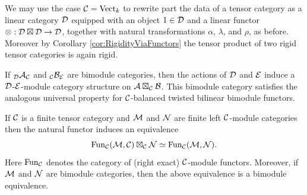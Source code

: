 \documentclass{amsart}
\begin{document}


\begin{remark} \label{rmk:rigidpreservedbytensor}
	We may use the case $\mathcal C= \mathrm{Vect}_k$ to rewrite part the data  of a tensor category as a linear category $\mathcal D$ equipped with an object $1 \in \mathcal D$ and a linear functor $\otimes: \mathcal D \boxtimes \mathcal D \to \mathcal D $, together with natural transformations $\alpha$, $\lambda$, and $\rho$, as before. Moreover by Corollary \ref{cor:RigidityViaFunctors} the tensor product of two rigid tensor categories is again rigid. 
\end{remark}

\begin{remark}
	If ${}_{\mathcal D}\mathcal A_{\mathcal C}$ and ${}_{\mathcal C}\mathcal B_{\mathcal E}$ are bimodule categories, then the actions of $\mathcal D$ and $\mathcal E$ induce a $\mathcal D$-$\mathcal E$-module category structure on $\mathcal A \boxtimes_{\mathcal C} \mathcal B$. This bimodule category satisfies the analogous universal property for $\mathcal C$-balanced twisted bilinear bimodule functors. 
\end{remark}

\begin{lemma} \label{Lma:FunctorsAsATensorPdt}
	If $\mathcal C$ is a finite tensor category and $\mathcal M$ and $\mathcal N$ are finite left $\mathcal C$-module categories then the natural functor induces an equivalence
	\begin{equation*}
		\operatorname{Fun}_\mathcal C(\mathcal M, \mathcal C) \boxtimes_\mathcal C \mathcal N \simeq \operatorname{Fun}_\mathcal C(\mathcal M,\mathcal N).
	\end{equation*}
	Here $\operatorname{Fun}_\mathcal C$ denotes the category of (right exact) $\mathcal C$-module functors. 
	Moreover, if $\mathcal M$ and $\mathcal N$ are bimodule categories, then the above equivalence is a bimodule equivalence. 
\end{lemma}
\end{document}
